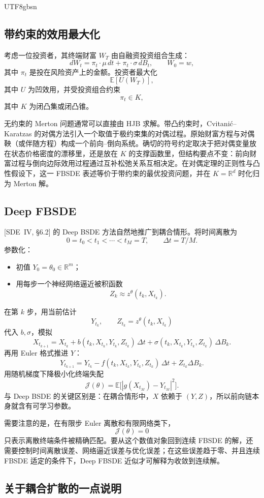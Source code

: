 \documentclass{article}
\theoremstyle{plain}
\theoremstyle{definition}
\theoremstyle{remark}
\numberwithin{equation}{section}
\newcommand{\E}{\mathbb{E}}
\newcommand{\R}{\mathbb{R}}
\begin{document}
\begin{CJK*}{UTF8}{gbsn}
\subsection{带约束的效用最大化}

考虑一位投资者，其终端财富 $W_T$ 由自融资投资组合生成：
\[
  dW_t=\pi_t\cdot\mu\,dt+\pi_t\cdot\sigma\,dB_t,\qquad W_0=w,
\]
其中 $\pi_t$ 是投在风险资产上的金额。投资者最大化
\[
  \E[U(W_T)],
\]
其中 $U$ 为凹效用，并受投资组合约束
\[
  \pi_t\in K,
\]
其中 $K$ 为闭凸集或闭凸锥。

无约束的 Merton 问题通常可以直接由 HJB 求解。带凸约束时，Cvitani\'c--Karatzas 的对偶方法引入一个取值于极约束集的对偶过程。原始财富方程与对偶鞅（或伴随方程）构成一个前向--倒向系统。确切的符号约定取决于把对偶变量放在状态价格密度的漂移里，还是放在 $K$ 的支撑函数里，但结构要点不变：前向财富过程与倒向边际效用过程通过互补松弛关系互相决定。在对偶定理的正则性与凸性假设下，这一 FBSDE 表述等价于带约束的最优投资问题，并在 $K=\R^d$ 时化归为 Merton 解。

\subsection{Deep FBSDE}

[SDE~IV, \S6.2] 的 Deep BSDE 方法自然地推广到耦合情形。将时间离散为
\[
  0=t_0<t_1<\cdots<t_M=T,\qquad \Delta t=T/M.
\]
参数化：
\begin{itemize}
  \item 初值 $Y_0=\theta_0\in\R^m$；
  \item 用每步一个神经网络逼近被积函数
  \[
    Z_k\approx z^\theta(t_k,X_{t_k}).
  \]
\end{itemize}
在第 $k$ 步，用当前估计
\[
  Y_{t_k},\qquad Z_{t_k}=z^\theta(t_k,X_{t_k})
\]
代入 $b,\sigma$，模拟
\[
  X_{t_{k+1}}=X_{t_k}+b(t_k,X_{t_k},Y_{t_k},Z_{t_k})\,\Delta t+\sigma(t_k,X_{t_k},Y_{t_k},Z_{t_k})\,\Delta B_k.
\]
再用 Euler 格式推进 $Y$：
\[
  Y_{t_{k+1}}=Y_{t_k}-f(t_k,X_{t_k},Y_{t_k},Z_{t_k})\,\Delta t+Z_{t_k}\Delta B_k.
\]
用随机梯度下降极小化终端失配
\[
  \mathcal J(\theta)=\E\bigl[|g(X_{t_M})-Y_{t_M}|^2\bigr].
\]
与 Deep BSDE 的关键区别是：在耦合情形中，$X$ 依赖于 $(Y,Z)$，所以前向链本身就含有可学习参数。

需要注意的是，在有限步 Euler 离散和有限网络类下，
\[
  \mathcal J(\theta)=0
\]
只表示离散终端条件被精确匹配。要从这个数值对象回到连续 FBSDE 的解，还需要控制时间离散误差、网络逼近误差与优化误差；在这些误差趋于零、并且连续 FBSDE 适定的条件下，Deep FBSDE 近似才可解释为收敛到连续解。

\subsection{关于耦合扩散的一点说明}


\end{CJK*}
\end{document}

